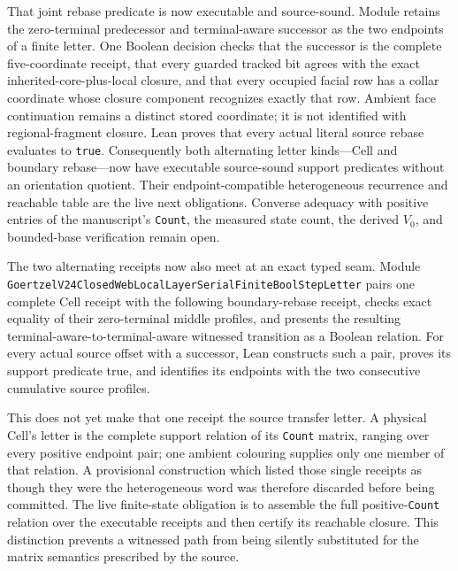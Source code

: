 \documentclass[11pt]{article}
\theoremstyle{definition}
\begin{document}
That joint rebase predicate is now executable and source-sound.  Module
retains the zero-terminal predecessor and terminal-aware successor as the two
endpoints of a finite letter.  One Boolean decision checks that the successor
is the complete five-coordinate receipt, that every guarded tracked bit agrees
with the exact inherited-core-plus-local closure, and that every occupied
facial row has a collar coordinate whose closure component recognizes exactly
that row.  Ambient face continuation remains a distinct stored coordinate;
it is not identified with regional-fragment closure.  Lean proves that every
actual literal source rebase evaluates to \texttt{true}.  Consequently both
alternating letter kinds---Cell and boundary rebase---now have executable
source-sound support predicates without an orientation quotient.  Their
endpoint-compatible heterogeneous recurrence and reachable table are the live
next obligations.  Converse adequacy with positive entries of the manuscript's
\texttt{Count}, the measured state count, the derived $V_0$, and bounded-base
verification remain open.

The two alternating receipts now also meet at an exact typed seam.  Module
\texttt{GoertzelV24ClosedWebLocalLayerSerialFiniteBoolStepLetter} pairs one
complete Cell receipt with the following boundary-rebase receipt, checks exact
equality of their zero-terminal middle profiles, and presents the resulting
terminal-aware-to-terminal-aware witnessed transition as a Boolean relation.
For every actual source offset with a successor, Lean constructs such a pair,
proves its support predicate true, and identifies its endpoints with the two
consecutive cumulative source profiles.

This does not yet make that one receipt the source transfer letter.  A physical
Cell's letter is the complete support relation of its \texttt{Count} matrix,
ranging over every positive endpoint pair; one ambient colouring supplies only
one member of that relation.  A provisional construction which listed those
single receipts as though they were the heterogeneous word was therefore
discarded before being committed.  The live finite-state obligation is to
assemble the full positive-\texttt{Count} relation over the executable receipts
and then certify its reachable closure.  This distinction prevents a witnessed
path from being silently substituted for the matrix semantics prescribed by
the source.
\end{document}
